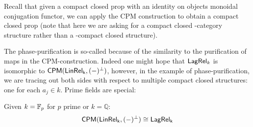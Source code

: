 %
Recall that given a compact closed prop with an identity on objects monoidal conjugation functor, we can apply the CPM construction to obtain a compact closed prop (note that here we are asking for a compact closed \dag-category structure rather than a \dag-compact closed structure).

The phase-purification is so-called because of the similarity to the purification of maps in the CPM-construction.  Indeed one might hope that $\mathsf{Lag}\mathsf{Rel}_k$ is isomorphic to $\mathsf{CPM}(\sf LinRel_k,(-)^\perp)$, however, in the example of phase-purification, we are tracing out both sides with respect to multiple compact closed structures:  one for each $a_j \in k$.  Prime fields are special:
\begin{corollary}
\label{cor}
Given $k=\mathbb{F}_p$ for $p$ prime or $k=\mathbb{Q}$:
$$\mathsf{CPM}(\sf LinRel_{k}, (-)^\perp) \cong \mathsf{Lag}\mathsf{Rel}_k$$
\end{corollary}
